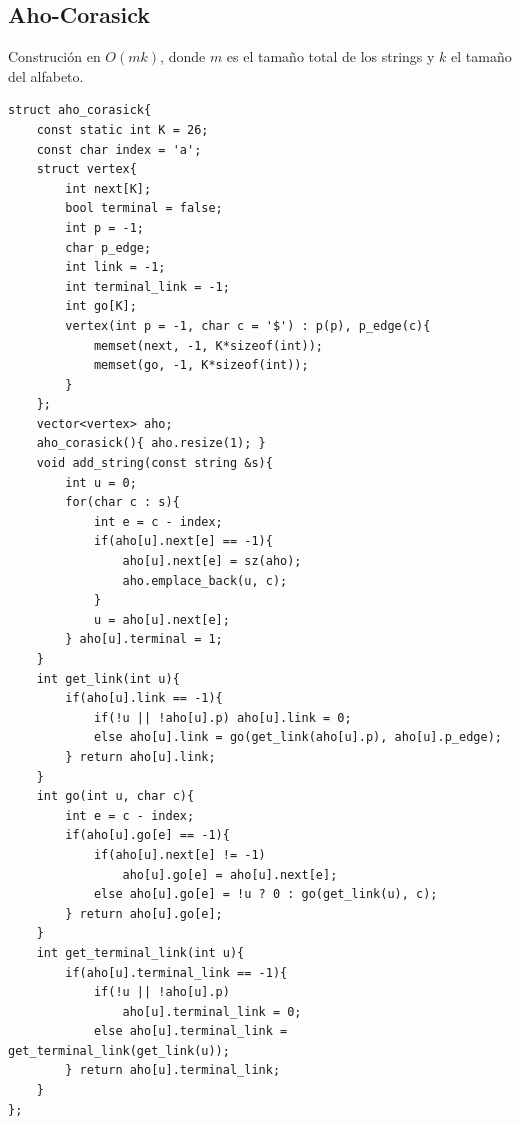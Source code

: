 \documentclass[10pt,spanish,mexico]{article}
\numberwithin{equation}{section}
\begin{document}
\begin{multicols}{2}
\vspace{-1.2\baselineskip}
\hrulefill
\subsection{Aho-Corasick}
Construción en $O(mk)$, donde $m$ es el tamaño total de los strings y $k$ el tamaño del alfabeto.
\begin{verbatim}
struct aho_corasick{
    const static int K = 26;
    const char index = 'a';
    struct vertex{
        int next[K];
        bool terminal = false;
        int p = -1;
        char p_edge;
        int link = -1;
        int terminal_link = -1;
        int go[K];
        vertex(int p = -1, char c = '$') : p(p), p_edge(c){
            memset(next, -1, K*sizeof(int));
            memset(go, -1, K*sizeof(int));
        }
    };
    vector<vertex> aho;
    aho_corasick(){ aho.resize(1); }
    void add_string(const string &s){
        int u = 0;
        for(char c : s){
            int e = c - index;
            if(aho[u].next[e] == -1){
                aho[u].next[e] = sz(aho);
                aho.emplace_back(u, c);
            }
            u = aho[u].next[e];
        } aho[u].terminal = 1;
    }
    int get_link(int u){
        if(aho[u].link == -1){
            if(!u || !aho[u].p) aho[u].link = 0;
            else aho[u].link = go(get_link(aho[u].p), aho[u].p_edge);
        } return aho[u].link;
    }
    int go(int u, char c){
        int e = c - index;
        if(aho[u].go[e] == -1){
            if(aho[u].next[e] != -1)
                aho[u].go[e] = aho[u].next[e];
            else aho[u].go[e] = !u ? 0 : go(get_link(u), c);
        } return aho[u].go[e];
    }
    int get_terminal_link(int u){
        if(aho[u].terminal_link == -1){
            if(!u || !aho[u].p)
                aho[u].terminal_link = 0;
            else aho[u].terminal_link = get_terminal_link(get_link(u));
        } return aho[u].terminal_link;
    }
};
\end{verbatim}

\vspace{-1.2\baselineskip}
\hrulefill

\end{multicols}
\end{document}

